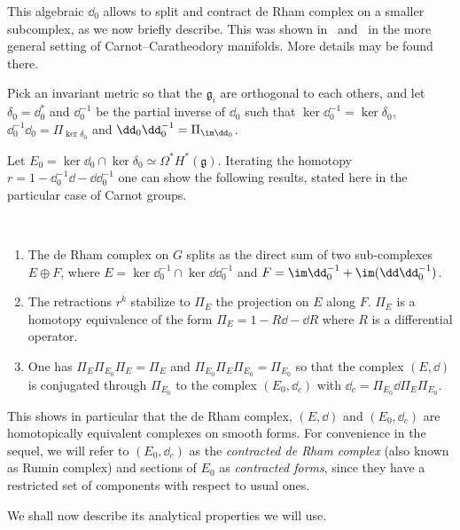 
This algebraic $\dd_0$ allows to split and contract de Rham complex on a smaller subcomplex, as we now briefly describe. This was shown in~\cite{Rumin_CRAS_1999} and~\cite{Rumin_TSG} in the more general setting of Carnot--Caratheodory manifolds. More details may be found there.

Pick an invariant metric so that the $\mathfrak{g}_i$ are orthogonal to each others, and let $\delta_0 = \dd_0^*$ and $\dd_0^{-1}$ be the partial inverse of $\dd_0$ such that $\ker \dd_0^{-1} = \ker \delta_0$, $\dd_0^{-1} \dd_0 = \Pi_{\ker \delta_0}$ and $\dd_0 \dd_0^{-1} = \Pi_{\im \dd_0}$.

Let $E_0 = \ker \dd_0 \cap \ker \delta_0 \simeq \Omega^* H^*(\mathfrak{g})$. Iterating the homotopy $r = 1 - \dd_0^{-1}\dd - \dd \dd_0 ^{-1}$ one can show the following results, stated here in the particular case of Carnot groups.

\let\oldpointir\pointir
\renewcommand{\pointir}{}
\begin{theo}\label{thm:dc-complex}
\ %
\begin{enumerate}
\item The de Rham complex on $G$ splits as the direct sum of two sub-complexes $E \oplus F$, where $E = \ker \dd_0^{-1} \cap \ker \dd \dd_0^{-1}$ and $F= \im \dd_0^{-1} + \im (\dd\dd_0^{-1}) $.
\item The retractions $r^k$ stabilize to $\Pi_E$ the projection on $E$ along $F$. $\Pi_E$ is a homotopy equivalence of the form $\Pi_E = 1 - R\dd - \dd R$ where $R$ is a differential operator.
\item One has $\Pi_E \Pi_{E_0} \Pi_E = \Pi_E$ and $\Pi_{E_0} \Pi_E \Pi_{E_0} = \Pi_{E_0}$ so that the complex $(E,\dd)$ is conjugated through $\Pi_{E_0}$ to the complex $(E_0, \dd_c)$ with $\dd_c = \Pi_{E_0} \dd \Pi_E \Pi_{E_0}$.
\end{enumerate}
\end{theo}
\let\pointir\oldpointir

This shows in particular that the de Rham complex, $(E,\dd)$ and $(E_0, \dd_c)$ are homotopically equivalent complexes on smooth forms. For convenience in the sequel, we will refer to $(E_0,\dd_c)$ as the \emph{contracted de Rham complex} (also known as Rumin complex) and sections of $E_0$ as \emph{contracted forms}, since they have a restricted set of components with respect to usual ones.

We shall now describe its analytical properties we will use.


